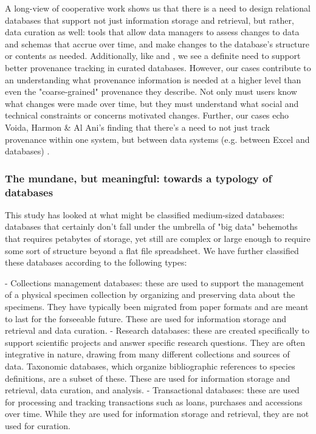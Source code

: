 A long-view of cooperative work shows us that there is a need to design relational databases that support not just information storage and retrieval, but rather, data curation as well: tools that allow data managers to assess changes to data and schemas that accrue over time, and make changes to the database's structure or contents as needed. Additionally, like \cite{Buneman_2006} and \cite{jagadish2007making}, we see a definite need to support better provenance tracking in curated databases. However, our cases contribute to an understanding what provenance information is needed at a higher level than even the "coarse-grained" provenance they describe. Not only must users know what changes were made over time, but they must understand what social and technical constraints or concerns motivated changes. Further, our cases echo Voida, Harmon & Al Ani's finding that there's a need to not just track provenance within one system, but between data systems (e.g. between Excel and databases) \cite{voida2011homebrew}.

\subsubsection{The mundane, but meaningful: towards a typology of databases}

This study has looked at what might be classified medium-sized databases: databases that certainly don't fall under the umbrella of "big data" behemoths that requires petabytes of storage, yet still are complex or large enough to require some sort of structure beyond a flat file spreadsheet. We have further classified these databases according to the following types:

- Collections management databases: these are used to support the management of a physical specimen collection by organizing and preserving data about the specimens. They have typically been migrated from paper formats and are meant to last for the forseeable future. These are used for information storage and retrieval and data curation.
- Research databases: these are created specifically to support scientific projects and answer specific research questions. They are often integrative in nature, drawing from many different collections and sources of data. Taxonomic databases, which organize bibliographic references to species definitions, are a subset of these. These are used for information storage and retrieval, data curation, and analysis.
- Transactional databases: these are used for processing and tracking transactions such as loans, purchases and accessions over time. While they are used for information storage and retrieval, they are not used for curation.


